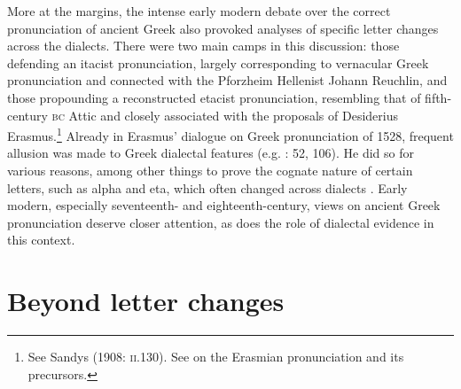 More at the margins, the intense early modern debate over the correct pronunciation of ancient Greek also provoked analyses of specific letter changes across the dialects. There were two main camps in this discussion: those defending an itacist pronunciation, largely corresponding to vernacular Greek pronunciation and connected with the Pforzheim Hellenist Johann Reuchlin, and those propounding a reconstructed etacist pronunciation, resembling that of fifth-century \textsc{bc} Attic and closely associated with the proposals of Desiderius Erasmus.\footnote{See Sandys (1908: \textsc{ii.}130). See \citet{Bywater1908} on the Erasmian pronunciation and its precursors.} Already in Erasmus’ dialogue on Greek pronunciation of 1528, frequent allusion was made to Greek dialectal features (e.g. \citealt{Erasmus1528}: 52, 106). He did so for various reasons, among other things to prove the cognate nature of certain letters, such as alpha and eta, which often changed across dialects \citep[62]{Erasmus1528}. Early modern, especially seventeenth- and eighteenth-century, views on ancient Greek pronunciation deserve closer attention, as does the role of dialectal evidence in this context.

\section{Beyond letter changes}

